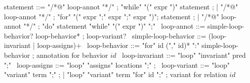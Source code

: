 \begin{syntax}
  statement ::= "/*@" loop-annot "*/" ;
  "while" "(" expr ")" statement ;
  | "/*@" loop-annot "*/" ;
  "for" "(" expr ";" expr ";" expr ")";
  statement ;
  | "/*@" loop-annot "*/" ;
  "do" statement "while" "(" expr ")" ";"
  \
  loop-annot ::= simple-loop-behavior? loop-behavior* ;
  loop-variant?
  \
  simple-loop-behavior ::= (loop-invariant | loop-assigns)+ 
  \
  loop-behavior ::= "for" id ("," id)* ":" simple-loop-behavior ; annotation for behavior $id$
  \
  loop-invariant ::= "loop" "invariant" pred ";" 
  \
  loop-assigns ::= "loop" "assigns" locations ";" ;
  \
  loop-variant ::= "loop" "variant" term ";" ;
  | "loop" "variant" term "for" id ";" ; variant for relation $id$
\end{syntax}

